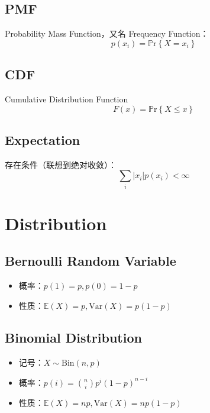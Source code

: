 \documentclass[9pt,landscape]{article}
\begin{document}
\begin{multicols}{3}
\subsection{PMF}

Probability Mass Function，又名 Frequency Function：
\begin{equation*}
	p(x_i)=\mathbb{P}\mathrm{r}\left\{X=x_i\right\}
\end{equation*}

\subsection{CDF}
Cumulative Distribution Function
\begin{equation*}
	F(x)=\mathbb{P}\mathrm{r}\left\{X\le x\right\}
\end{equation*}

\subsection{Expectation}

存在条件（联想到绝对收敛）：
\begin{equation*}
	\sum_{i}\left|x_i\right|p(x_i)<\infty
\end{equation*}

\section{Distribution}

\subsection{Bernoulli Random Variable}
\begin{itemize}
	\item 概率：$p(1)=p, p(0)=1-p$
	\item 性质：$\mathbb{E}(X)=p,\text{Var}(X)=p(1-p)$
\end{itemize}
\subsection{Binomial Distribution}
\begin{itemize}
	\item 记号：$X\sim \mathrm{Bin}(n,p)$
	\item 概率：$p(i)=\binom{n}{i}p^i(1-p)^{n-i}$
	\item 性质：$\mathbb{E}(X)=np,\text{Var}(X)=np(1-p)$
\end{itemize}


\end{multicols}
\end{document}
